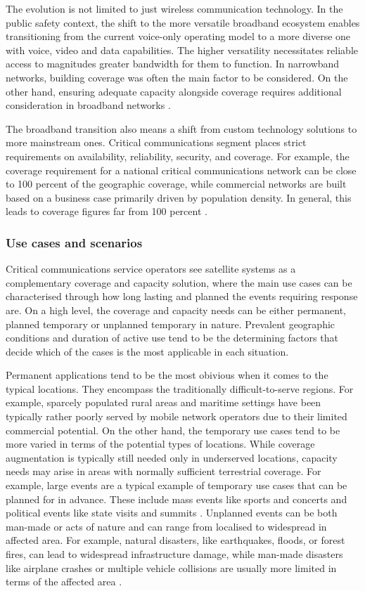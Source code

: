 \documentclass[english, 12pt, a4paper, elec, utf8, a-1b, online]{aaltothesis}
\begin{document}
The evolution is not limited to just wireless communication technology. In the public safety context, the shift to the more versatile broadband ecosystem enables transitioning from the current voice-only operating model to a more diverse one with voice, video and data capabilities. The higher versatility necessitates reliable access to magnitudes greater bandwidth for them to function. In narrowband networks, building coverage was often the main factor to be considered. On the other hand, ensuring adequate capacity alongside coverage requires additional consideration in broadband networks \cite{saynevirta2021satellite}.

The broadband transition also means a shift from custom technology solutions to more mainstream ones. Critical communications segment places strict requirements on availability, reliability, security, and coverage. For example, the coverage requirement for a national critical communications network can be close to 100 percent of the geographic coverage, while commercial networks are built based on a business case primarily driven by population density. In general, this leads to coverage figures far from 100 percent \cite{saynevirta2021satellite}.

\subsubsection{Use cases and scenarios}
Critical communications service operators see satellite systems as a complementary coverage and capacity solution, where the main use cases can be characterised through how long lasting and planned the events requiring response are.
On a high level, the coverage and capacity needs can be either permanent, planned temporary or unplanned temporary in nature.
Prevalent geographic conditions and duration of active use tend to be the determining factors that decide which of the cases is the most applicable in each situation.

Permanent applications tend to be the most obivious when it comes to the typical locations. They encompass the traditionally difficult-to-serve regions.
For example, sparcely populated rural areas and maritime settings have been typically rather poorly served by mobile network operators due to their limited commercial potential.
On the other hand, the temporary use cases tend to be more varied in terms of the potential types of locations. While coverage augmentation is typically still needed only in underserved locations, capacity needs may arise in areas with normally sufficient terrestrial coverage.
For example, large events are a typical example of temporary use cases that can be planned for in advance. These include mass events like sports and concerts and political events like state visits and summits \cite{erve2018trump, tcca2021airbus, airbus2023bahrain}.
Unplanned events can be both man-made or acts of nature and can range from localised to widespread in affected area. For example, natural disasters, like earthquakes, floods, or forest fires, can lead to widespread infrastructure damage, while man-made disasters like airplane crashes or multiple vehicle collisions are usually more limited in terms of the affected area \cite{firstnet2021wildfire, firstnet2021nashville}.
\end{document}
